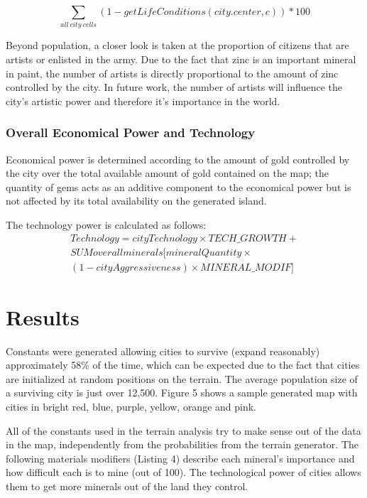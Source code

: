 \begin{equation}
\sum_{all\ city\ cells} (1 - getLifeConditions(city.center, c)) * 100
\end{equation}

Beyond population, a closer look is taken at the proportion of citizens that are artists or enlisted in the army. Due to the fact that zinc is an important mineral in paint, the number of artists is directly proportional to the amount of zinc controlled by the city. In future work, the number of artists will influence the city's artistic power and therefore it's importance in the world.

\subsubsection{Overall Economical Power and Technology}
Economical power is determined according to the amount of gold controlled by the city over the total available amount of gold contained on the map; the quantity of gems acts as an additive component to the economical power but is not affected by its total availability on the generated island.

The technology power is calculated as follows:
\begin{equation}
\begin{split}
Technology = cityTechnology \times TECH\_GROWTH + \\ SUM over all minerals [mineralQuantity \times \\ (1 - cityAggressiveness) \times MINERAL\_MODIF]
\end{split}
\end{equation}

\section{Results}
Constants were generated allowing cities to survive (expand reasonably) approximately 58\% of the time, which can be expected due to the fact that cities are initialized at random positions on the terrain. The average population size of a surviving city is just over 12,500. Figure 5 shows a sample generated map with cities in bright red, blue, purple, yellow, orange and pink.

All of the constants used in the terrain analysis try to make sense out of the data in the map, independently from the probabilities from the terrain generator. The following materials modifiers (Listing 4) describe each mineral's importance and how difficult each is to mine (out of 100). The technological power of cities allows them to get more minerals out of the land they control.

